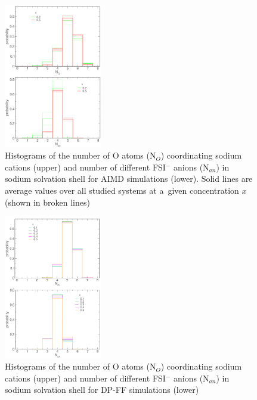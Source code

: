 \begin{figure}[H]
    \centering
    \includegraphics[width=0.38\textwidth]{img/3-structural-data-from-md-simulations/1-emim-fsi/rdf/stat-aimd.png}
    \singlespacing
    \caption{Histograms of the number of O atoms (N$_O$) coordinating sodium cations (upper) and number of different FSI$^{-}$ anions (N$_{an}$) in sodium solvation shell for AIMD simulations (lower). Solid lines are average values over all studied systems at a~given concentration $x$ (shown in broken lines)}
    \label{fig:emim-fsi-rdf-stat-aimd}
\end{figure}

\begin{figure}[H]
    \centering
    \includegraphics[width=0.38\textwidth]{img/3-structural-data-from-md-simulations/1-emim-fsi/rdf/stat-dpff.png}
    \singlespacing
    \caption{Histograms of the number of O atoms (N$_O$) coordinating sodium cations (upper) and number of different FSI$^{-}$ anions (N$_{an}$) in sodium solvation shell for DP-FF simulations (lower)}
    \label{fig:emim-fsi-rdf-stat-dpff}
\end{figure}

